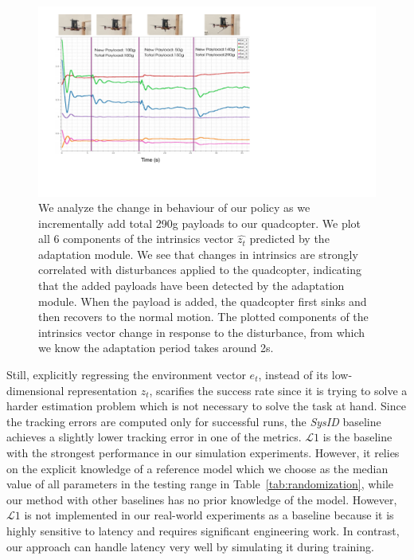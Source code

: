 \begin{figure}[t]
    \centering
    \includegraphics[width=\columnwidth]{img/extrinsics_plot_timescale.pdf}
    \caption{We analyze the change in behaviour of our policy as we incrementally add total 290g payloads to our quadcopter. We plot all 6 components of the intrinsics vector $\hat{z_t}$ predicted by the adaptation module. We see that changes in intrinsics are strongly correlated with disturbances applied to the quadcopter, indicating that the added payloads have been detected by the adaptation module. When the payload is added, the quadcopter first sinks and then recovers to the normal motion. The plotted components of the intrinsics vector change in response to the disturbance, from which we know the adaptation period takes around 2s.}
    \label{fig:intrinsics_analysis}
\end{figure}
%
Still, explicitly regressing the environment vector $e_t$, instead of its low-dimensional representation $z_t$, scarifies the success rate since it is trying to solve a harder estimation problem which is not necessary to solve the task at hand.
%
Since the tracking errors are computed only for successful runs, the \emph{SysID} baseline achieves a slightly lower tracking error in one of the metrics.
%
$\mathcal{L}1$ is the baseline with the strongest performance in our simulation experiments. However, it relies on the explicit knowledge of a reference model which we choose as the median value of all parameters in the testing range in Table~\ref{tab:randomization}, while our method with other baselines has no prior knowledge of the model. 
%
However, $\mathcal{L}1$ is not implemented in our real-world experiments as a baseline because it is highly sensitive to latency and requires significant engineering work. In contrast, our approach can handle latency very well by simulating it during training.
